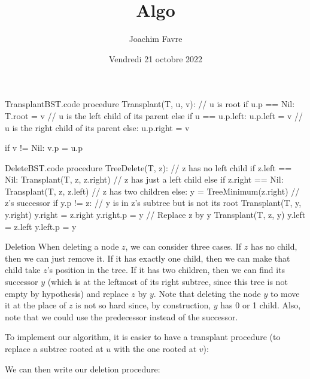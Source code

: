 \documentclass[a4paper]{article}
\title{Algo}
\author{Joachim Favre}
\date{Vendredi 21 octobre 2022}
\begin{document}
\maketitle


\begin{filecontents*}[overwrite]{TransplantBST.code}
procedure Transplant(T, u, v):
    // u is root
    if u.p == Nil:  
        T.root = v
    // u is the left child of its parent
    else if u == u.p.left:  
        u.p.left = v
    // u is the right child of its parent
    else:
        u.p.right = v
    
    if v != Nil:
        v.p = u.p
\end{filecontents*}

\begin{filecontents*}[overwrite]{DeleteBST.code}
procedure TreeDelete(T, z):
    // z has no left child
    if z.left == Nil:
        Transplant(T, z, z.right)
    // z has just a left child
    else if z.right == Nil:
        Transplant(T, z, z.left)
    // z has two children
    else:
        y = TreeMinimum(z.right) // z's successor
        if y.p != z:
            // y is in z's subtree but is not its root
            Transplant(T, y, y.right)
            y.right = z.right
            y.right.p = y
        // Replace z by y
        Transplant(T, z, y)
        y.left = z.left
        y.left.p = y
\end{filecontents*}



\begin{parag}{Deletion}
    When deleting a node $z$, we can consider three cases. If $z$ has no child, then we can just remove it. If it has exactly one child, then we can make that child take $z$'s position in the tree. If it has two children, then we can find its successor $y$ (which is at the leftmost of its right subtree, since this tree is not empty by hypothesis) and replace $z$ by $y$. Note that deleting the node $y$ to move it at the place of $z$ is not so hard since, by construction, $y$ has 0 or 1 child. Also, note that we could use the predecessor instead of the successor.

    To implement our algorithm, it is easier to have a transplant procedure (to replace a subtree rooted at $u$ with the one rooted at $v$):
     
    We can then write our deletion procedure:
    
\end{parag}
\end{document}
